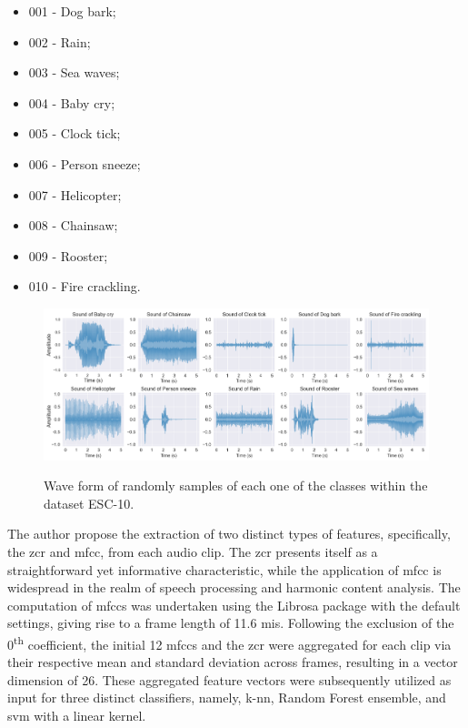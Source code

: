 \begin{itemize}
    \item 001 - Dog bark;
    \item 002 - Rain;
    \item 003 - Sea waves;
    \item 004 - Baby cry;
    \item 005 - Clock tick;
    \item 006 - Person sneeze;
    \item 007 - Helicopter;
    \item 008 - Chainsaw;
    \item 009 - Rooster;
    \item 010 - Fire crackling.
\end{itemize}

\begin{figure}[htbp]
    \raggedright
        \caption{Wave form of randomly samples of each one of the classes within the dataset ESC-10.}
        \includegraphics[width=1\textwidth]{resources/images/050-methods/Methods_dataset_ESC-10.png}
        \label{fig:methods_dataset_ESC-10}
\end{figure}

The author propose the extraction of two distinct types of features, specifically, the \gls{zcr} and \gls{mfcc}, from each audio clip. The \gls{zcr} presents itself as a straightforward yet informative characteristic, while the application of \gls{mfcc} is widespread in the realm of speech processing and harmonic content analysis. The computation of \gls{mfcc}s was undertaken using the Librosa package \cite{McFee2015librosa_sw} with the default settings, giving rise to a frame length of 11.6 \gls{mi}\gls{s}. Following the exclusion of the 0\textsuperscript{th} coefficient, the initial 12 \gls{mfcc}s and the \gls{zcr} were aggregated for each clip via their respective mean and standard deviation across frames, resulting in a vector dimension of 26. These aggregated feature vectors were subsequently utilized as input for three distinct classifiers, namely, \gls{k-nn}, Random Forest ensemble, and \gls{svm} with a linear kernel. 

